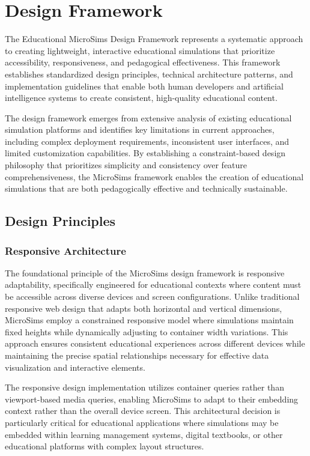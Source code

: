 \section{Design Framework}
\label{sec:framework}

The Educational MicroSims Design Framework represents a systematic approach to creating lightweight, interactive educational simulations that prioritize accessibility, responsiveness, and pedagogical effectiveness. This framework establishes standardized design principles, technical architecture patterns, and implementation guidelines that enable both human developers and artificial intelligence systems to create consistent, high-quality educational content.

The design framework emerges from extensive analysis of existing educational simulation platforms and identifies key limitations in current approaches, including complex deployment requirements, inconsistent user interfaces, and limited customization capabilities. By establishing a constraint-based design philosophy that prioritizes simplicity and consistency over feature comprehensiveness, the MicroSims framework enables the creation of educational simulations that are both pedagogically effective and technically sustainable.

\subsection{Design Principles}

\subsubsection{Responsive Architecture}

The foundational principle of the MicroSims design framework is responsive adaptability, specifically engineered for educational contexts where content must be accessible across diverse devices and screen configurations. Unlike traditional responsive web design that adapts both horizontal and vertical dimensions, MicroSims employ a constrained responsive model where simulations maintain fixed heights while dynamically adjusting to container width variations. This approach ensures consistent educational experiences across different devices while maintaining the precise spatial relationships necessary for effective data visualization and interactive elements.

The responsive design implementation utilizes container queries rather than viewport-based media queries, enabling MicroSims to adapt to their embedding context rather than the overall device screen. This architectural decision is particularly critical for educational applications where simulations may be embedded within learning management systems, digital textbooks, or other educational platforms with complex layout structures.

